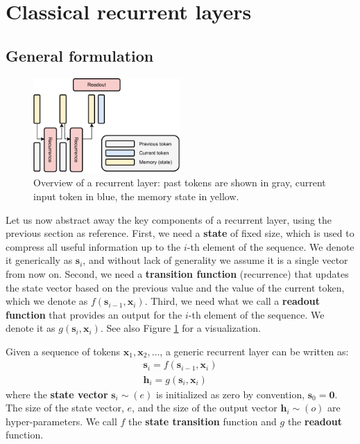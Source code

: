 \section{Classical recurrent layers}
\subsection{General formulation}

\begin{figure}
    \centering
    \hspace{2em}\includegraphics[width=0.5\textwidth]{images/recurrence}
    \caption{Overview of a recurrent layer: past tokens are shown in gray, current input token in blue, the memory state in yellow.}
    \label{fig:recurrence}
\end{figure}

Let us now abstract away the key components of a recurrent layer, using the previous section as reference. First, we need a \textbf{state} of fixed size, which is used to compress all useful information up to the $i$-th element of the sequence. We denote it generically as $\mathbf{s}_i$, and without lack of generality we assume it is a single vector from now on. Second, we need a \textbf{transition function} (recurrence) that updates the state vector based on the previous value and the value of the current token, which we denote as $f(\mathbf{s}_{i-1}, \mathbf{x}_i)$. Third, we need what we call a \textbf{readout function} that provides an output for the $i$-th element of the sequence. We denote it as $g(\mathbf{s}_i, \mathbf{x}_i)$. See also Figure \ref{fig:recurrence} for a visualization. 

\begin{definition} \addbottle
%
Given a sequence of tokens $\mathbf{x}_1, \mathbf{x}_2, \ldots$, a generic recurrent layer can be written as: 
%
\begin{gather}
\mathbf{s}_i = f(\mathbf{s}_{i-1},\mathbf{x}_i) \label{eq:recurrent_layer_state_update} \\ 
\mathbf{h}_i = g(\mathbf{s}_i, \mathbf{x}_i) \label{eq:recurrent_layer_readout}
\end{gather}
%
where the \textbf{state vector} $\mathbf{s}_i \sim (e)$ is initialized as zero by convention, $\mathbf{s}_0 = \mathbf{0}$. The size of the state vector, $e$, and the size of the output vector $\mathbf{h}_i \sim (o)$ are hyper-parameters. We call $f$ the \textbf{state transition} function and $g$ the \textbf{readout} function.
%
\end{definition}

